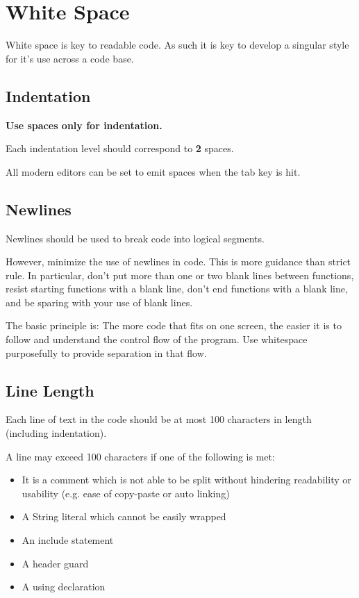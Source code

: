 \chapter{White Space}

  White space is key to readable code.
  As such it is key to develop a singular style for it's use across a code base.

  \section{Indentation}

    \begin{keybox}[Spaces]
      \textbf{Use spaces only for indentation.}
    \end{keybox}

    Each indentation level should correspond to \textbf{2} spaces.

    All modern editors can be set to emit spaces when the tab key is hit.

  \section{Newlines}

    Newlines should be used to break code into logical segments.

    However, minimize the use of newlines in code.
    This is more guidance than strict rule.
    In particular, don't put more than one or two blank lines between functions, resist starting functions with a blank line, don't end functions with a blank line, and be sparing with your use of blank lines.

    The basic principle is: The more code that fits on one screen, the easier it is to follow and understand the control flow of the program.
    Use whitespace purposefully to provide separation in that flow.

  \section{Line Length}

    Each line of text in the code should be at most 100 characters in length (including indentation).

    A line may exceed 100 characters if one of the following is met:
    \begin{itemize}
      \item It is a comment which is not able to be split without hindering readability or usability (e.g. ease of copy-paste or auto linking)
      \item A String literal which cannot be easily wrapped
      \item An include statement
      \item A header guard
      \item A using declaration
    \end{itemize}